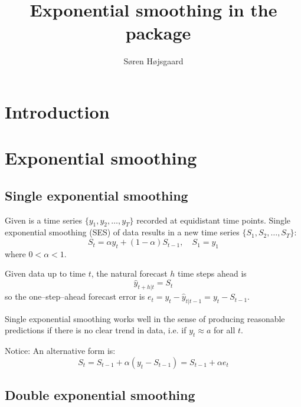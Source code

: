 \documentclass[10pt]{article}\usepackage[]{graphicx}\usepackage[]{color}
\title{Exponential smoothing in the \di\ package}
\author{S{\o}ren H{\o}jsgaard}
\begin{document}
\maketitle


\def\DS{S^{[2]}}





\tableofcontents
\parindent0pt\parskip5pt

\section{Introduction}
\label{sec:introduction}

\section{Exponential smoothing}
\label{sec:expon-smooth}


\subsection{Single exponential smoothing}
\label{sec:ses}

Given is a time series $\{y_1, y_2, \dots, y_T\}$ recorded at
equidistant time points.  Single exponential smoothing (SES) of
data results in a new time series $\{S_1, S_2, \dots, S_T\}$:
\begin{displaymath}
  S_t = \alpha y_t + (1-\alpha) S_{t-1}, \quad S_1=y_1
\end{displaymath}
where $0 < \alpha < 1$.

Given data up to time $t$, the natural forecast $h$ time steps ahead is
\begin{displaymath}
  \hat y_{t+h|t} = S_t
\end{displaymath}
so the one--step--ahead forecast error is
$e_t = y_t - \hat y_{t|t-1} = y_t-S_{t-1}$.

Single exponential smoothing works well in the sense of producing
reasonable predictions if there is no clear trend in data, i.e. if
$y_t \approx a$ for all $t$.

Notice: An alternative form is:
\begin{displaymath}
  S_t = S_{t-1} + \alpha (y_t-S_{t-1}) = S_{t-1} + \alpha e_t
\end{displaymath}



\subsection{Double exponential smoothing}
\label{sec:des}
\end{document}
